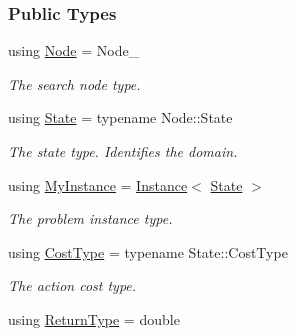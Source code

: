 \subsubsection*{Public Types}
\begin{DoxyCompactItemize}
\item 
using \hyperlink{structalgorithm_1_1PerGoal_a6778b78dc81bdd1b8c99b44fb46d3d4a}{Node} = Node\+\_\+\hypertarget{structalgorithm_1_1PerGoal_a6778b78dc81bdd1b8c99b44fb46d3d4a}{}\label{structalgorithm_1_1PerGoal_a6778b78dc81bdd1b8c99b44fb46d3d4a}

\begin{DoxyCompactList}\small\item\em The search node type. \end{DoxyCompactList}\item 
using \hyperlink{structalgorithm_1_1PerGoal_ab4119702c831126f7b1d44e92033fe32}{State} = typename Node\+::\+State\hypertarget{structalgorithm_1_1PerGoal_ab4119702c831126f7b1d44e92033fe32}{}\label{structalgorithm_1_1PerGoal_ab4119702c831126f7b1d44e92033fe32}

\begin{DoxyCompactList}\small\item\em The state type. Identifies the domain. \end{DoxyCompactList}\item 
using \hyperlink{structalgorithm_1_1PerGoal_abc8d409fe41f1ee61d4c1a6132c62801}{My\+Instance} = \hyperlink{structInstance}{Instance}$<$ \hyperlink{structalgorithm_1_1PerGoal_ab4119702c831126f7b1d44e92033fe32}{State} $>$\hypertarget{structalgorithm_1_1PerGoal_abc8d409fe41f1ee61d4c1a6132c62801}{}\label{structalgorithm_1_1PerGoal_abc8d409fe41f1ee61d4c1a6132c62801}

\begin{DoxyCompactList}\small\item\em The problem instance type. \end{DoxyCompactList}\item 
using \hyperlink{structalgorithm_1_1PerGoal_a9be0e9fec09380d813f9d4d3617eeb5a}{Cost\+Type} = typename State\+::\+Cost\+Type\hypertarget{structalgorithm_1_1PerGoal_a9be0e9fec09380d813f9d4d3617eeb5a}{}\label{structalgorithm_1_1PerGoal_a9be0e9fec09380d813f9d4d3617eeb5a}

\begin{DoxyCompactList}\small\item\em The action cost type. \end{DoxyCompactList}\item 
using \hyperlink{structalgorithm_1_1PerGoal_abe16f9913b5ec8d9ee8ebb93e375eba0}{Return\+Type} = double\hypertarget{structalgorithm_1_1PerGoal_abe16f9913b5ec8d9ee8ebb93e375eba0}{}\label{structalgorithm_1_1PerGoal_abe16f9913b5ec8d9ee8ebb93e375eba0}


\end{DoxyCompactItemize}
